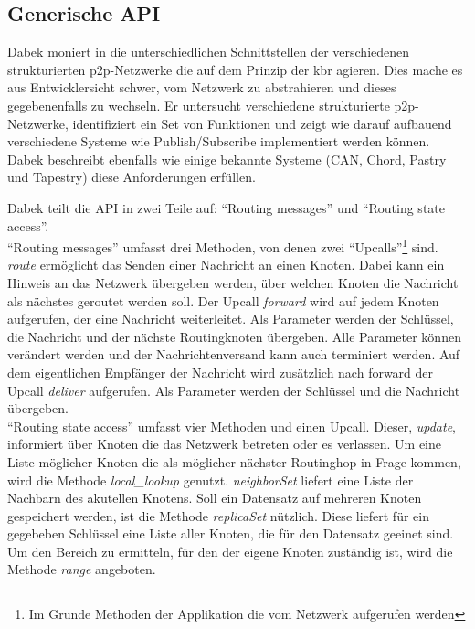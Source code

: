 \subsection{Generische API}
\label{chap:grundlagen:api}
Dabek moniert in \cite{Dabek2003Towards} die unterschiedlichen Schnittstellen der verschiedenen strukturierten p2p-Netzwerke die auf dem Prinzip der \ac{kbr} agieren. Dies mache es aus Entwicklersicht schwer, vom Netzwerk zu abstrahieren und dieses gegebenenfalls zu wechseln. Er untersucht verschiedene strukturierte p2p-Netzwerke, identifiziert ein Set von Funktionen  und zeigt wie darauf aufbauend verschiedene Systeme wie Publish/Subscribe implementiert werden können. Dabek beschreibt ebenfalls wie einige bekannte Systeme (CAN, Chord, Pastry und Tapestry) diese Anforderungen erfüllen.

Dabek teilt die API in zwei Teile auf: ``Routing messages'' und ``Routing state access''.\\
``Routing messages'' umfasst drei Methoden, von denen zwei ``Upcalls''\footnote{Im Grunde Methoden der Applikation die vom Netzwerk aufgerufen werden} sind. \emph{route} ermöglicht das Senden einer Nachricht an einen Knoten. Dabei kann ein Hinweis an das Netzwerk übergeben werden, über welchen Knoten die Nachricht als nächstes geroutet werden soll. Der Upcall \emph{forward} wird auf jedem Knoten aufgerufen, der eine Nachricht weiterleitet. Als Parameter werden der Schlüssel, die Nachricht und der nächste Routingknoten übergeben. Alle Parameter können verändert werden und der Nachrichtenversand kann auch terminiert werden. Auf dem eigentlichen Empfänger der Nachricht wird zusätzlich nach forward der Upcall \emph{deliver} aufgerufen. Als Parameter werden der Schlüssel und die Nachricht übergeben.\\
``Routing state access'' umfasst vier Methoden und einen Upcall. Dieser, \emph{update}, informiert über Knoten die das Netzwerk betreten oder es verlassen. Um eine Liste möglicher Knoten die als möglicher nächster Routinghop in Frage kommen, wird die Methode \emph{local\_lookup} genutzt. \emph{neighborSet} liefert eine Liste der Nachbarn des akutellen Knotens. Soll ein Datensatz auf mehreren Knoten gespeichert werden, ist die Methode \emph{replicaSet} nützlich. Diese liefert für ein gegebeben Schlüssel eine Liste aller Knoten, die für den Datensatz geeinet sind. Um den Bereich zu ermitteln, für den der eigene Knoten zuständig ist, wird die Methode \emph{range} angeboten.
